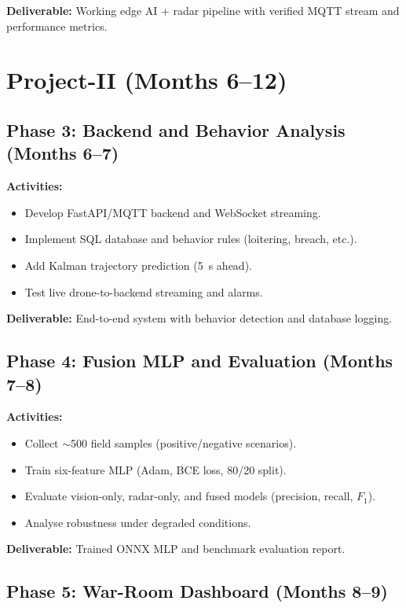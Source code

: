 \textbf{Deliverable:} Working edge AI + radar pipeline with verified MQTT stream and performance metrics.

\section{Project-II (Months 6--12)}

\subsection{Phase 3: Backend and Behavior Analysis (Months 6--7)}

\textbf{Activities:}
\begin{itemize}
    \item Develop FastAPI/MQTT backend and WebSocket streaming.
    \item Implement SQL database and behavior rules (loitering, breach, etc.).
    \item Add Kalman trajectory prediction (5~s ahead).
    \item Test live drone-to-backend streaming and alarms.
\end{itemize}

\textbf{Deliverable:} End-to-end system with behavior detection and database logging.

\subsection{Phase 4: Fusion MLP and Evaluation (Months 7--8)}

\textbf{Activities:}
\begin{itemize}
    \item Collect $\sim$500 field samples (positive/negative scenarios).
    \item Train six-feature MLP (Adam, BCE loss, 80/20 split).
    \item Evaluate vision-only, radar-only, and fused models (precision, recall, $F_1$).
    \item Analyse robustness under degraded conditions.
\end{itemize}

\textbf{Deliverable:} Trained ONNX MLP and benchmark evaluation report.

\subsection{Phase 5: War-Room Dashboard (Months 8--9)}


